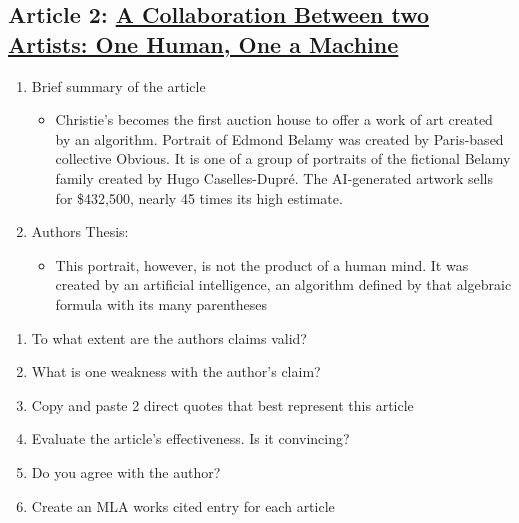 \documentclass{scrartcl}
\begin{document}
\subsection{Article 2:  \href{https://www.christies.com/features/A-collaboration-between-two-artists-one-human-one-a-machine-9332-1.aspx}{A Collaboration Between two Artists: One Human, One a Machine}}
\label{sec:orgfdb7d05}
\begin{enumerate}
\item Brief summary of the article
\begin{itemize}
\item Christie's becomes the first auction house to offer a work of art created by an algorithm. Portrait of Edmond Belamy was created by Paris-based
collective Obvious. It is one of a group of portraits of the fictional
Belamy family created by Hugo Caselles-Dupré. The AI-generated artwork
sells for \$432,500, nearly 45 times its high estimate.
\end{itemize}

\item Authors Thesis:
\begin{itemize}
\item This portrait, however, is not the product of a human mind. It was created by an artificial intelligence, an algorithm defined by that algebraic formula with its many parentheses
\end{itemize}
\end{enumerate}
\begin{enumerate}
\item To what extent are the authors claims valid?
\item What is one weakness with the author's claim?
\item Copy and paste 2 direct quotes that best represent this article
\item Evaluate the article's effectiveness. Is it convincing?
\item Do you agree with the author?
\item Create an MLA works cited entry for each article
\end{enumerate}
\end{document}
